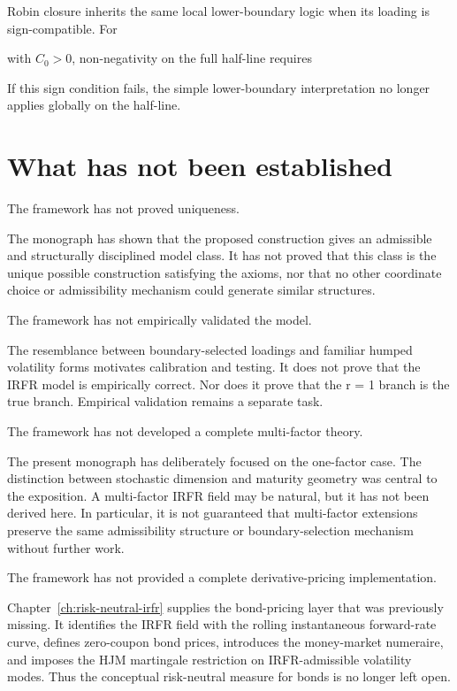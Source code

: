 \documentclass[11pt,oneside]{book}
\begin{document}
Robin closure inherits the same local lower-boundary logic when its
loading is sign-compatible. For

with $C_0>0$, non-negativity on the full half-line requires

If this sign condition fails, the simple lower-boundary interpretation
no longer applies globally on the half-line.

\section{What has not been
established}\label{what-has-not-been-established}

The framework has not proved uniqueness.

The monograph has shown that the proposed construction gives an
admissible and structurally disciplined model class. It has not proved
that this class is the unique possible construction satisfying the
axioms, nor that no other coordinate choice or admissibility mechanism
could generate similar structures.

The framework has not empirically validated the model.

The resemblance between boundary-selected loadings and familiar humped
volatility forms motivates calibration and testing. It does not prove
that the IRFR model is empirically correct. Nor does it prove that the r
= 1 branch is the true branch. Empirical validation remains a separate
task.

The framework has not developed a complete multi-factor theory.

The present monograph has deliberately focused on the one-factor case.
The distinction between stochastic dimension and maturity geometry was
central to the exposition. A multi-factor IRFR field may be natural, but
it has not been derived here. In particular, it is not guaranteed that
multi-factor extensions preserve the same admissibility structure or
boundary-selection mechanism without further work.

The framework has not provided a complete derivative-pricing
implementation.

Chapter~\ref{ch:risk-neutral-irfr} supplies the bond-pricing layer that
was previously missing. It identifies the IRFR field with the rolling
instantaneous forward-rate curve, defines zero-coupon bond prices,
introduces the money-market numeraire, and imposes the HJM martingale
restriction on IRFR-admissible volatility modes. Thus the conceptual
risk-neutral measure for bonds is no longer left open.
\end{document}
